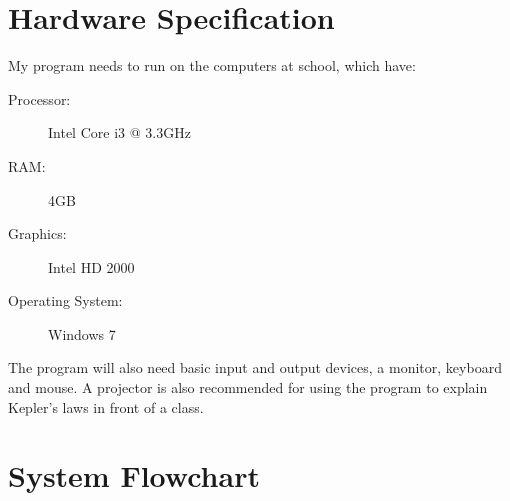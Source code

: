 \section{Hardware Specification}

My program needs to run on the computers at school, which have:
\begin{description}
	\item[Processor:] Intel Core i3 @ 3.3GHz
	\item[RAM:] 4GB
	\item[Graphics:] Intel HD 2000
	\item[Operating System:] Windows 7
\end{description}

The program will also need basic input and output devices, a monitor, keyboard
and mouse. A projector is also recommended for using the program to explain
Kepler's laws in front of a class.

\section{System Flowchart}

